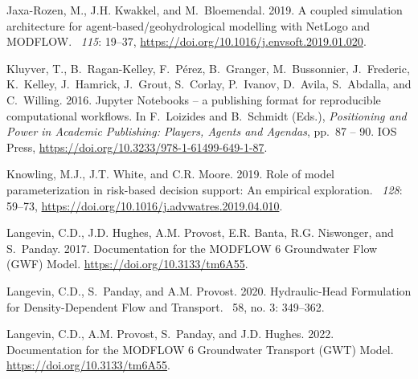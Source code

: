 \documentclass[12pt, oneside]{article}  	%
\begin{document}
\begin{thebibliography}{}
Jaxa-Rozen, M., J.H. Kwakkel, and M.~Bloemendal. 2019.
\newblock A coupled simulation architecture for agent-based/geohydrological
  modelling with NetLogo and MODFLOW.
~{\em 115}: 19--37,
  \url{https://doi.org/10.1016/j.envsoft.2019.01.020}.

Kluyver, T., B.~Ragan-Kelley, F.~P{\'e}rez, B.~Granger, M.~Bussonnier,
  J.~Frederic, K.~Kelley, J.~Hamrick, J.~Grout, S.~Corlay, P.~Ivanov, D.~Avila,
  S.~Abdalla, and C.~Willing. 2016.
\newblock Jupyter Notebooks -- a publishing format for reproducible
  computational workflows.
\newblock In F.~Loizides and B.~Schmidt (Eds.), {\em Positioning and Power in
  Academic Publishing: Players, Agents and Agendas}, pp.\  87 -- 90. IOS Press,
  \url{https://doi.org/10.3233/978-1-61499-649-1-87}.

Knowling, M.J., J.T. White, and C.R. Moore. 2019.
\newblock Role of model parameterization in risk-based decision support: An
  empirical exploration.
~{\em 128}: 59--73,
  \url{https://doi.org/10.1016/j.advwatres.2019.04.010}.

Langevin, C.D., J.D. Hughes, A.M. Provost, E.R. Banta, R.G. Niswonger, and
  S.~Panday. 2017.
\newblock Documentation for the MODFLOW 6 Groundwater Flow (GWF) Model.
 \url{https://doi.org/10.3133/tm6A55}.

Langevin, C.D., S.~Panday, and A.M. Provost. 2020.
\newblock Hydraulic-Head Formulation for Density-Dependent Flow and Transport.
~58, no. 3: 349--362.

Langevin, C.D., A.M. Provost, S.~Panday, and J.D. Hughes. 2022.
\newblock Documentation for the MODFLOW 6 Groundwater Transport (GWT) Model.
 \url{https://doi.org/10.3133/tm6A55}.


\end{thebibliography}
\end{document}
